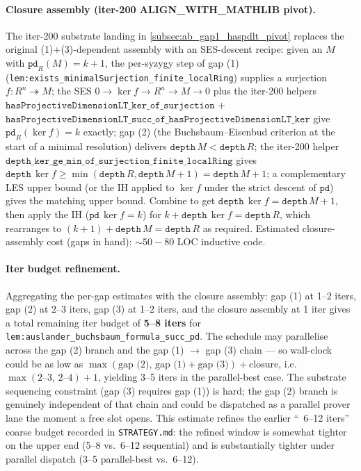 \paragraph{Closure assembly (iter-200 ALIGN\_WITH\_MATHLIB pivot).} The
iter-200 substrate landing in \ref{subsec:ab_gap1_haspdlt_pivot}
replaces the original (1)+(3)-dependent assembly with an SES-descent
recipe: given an \(M\) with \(\texttt{pd}_R(M) = k+1\), the
per-syzygy step of gap (1)
(\texttt{lem:exists_minimalSurjection_finite_localRing}) supplies a
surjection \(f : R^n \twoheadrightarrow M\); the SES
\(0 \to \ker f \to R^n \to M \to 0\) plus the iter-200 helpers
\(\texttt{hasProjectiveDimensionLT\_ker\_of\_surjection}\) +
\(\texttt{hasProjectiveDimensionLT\_succ\_of\_hasProjectiveDimensionLT\_ker}\)
give \(\texttt{pd}_R(\ker f) = k\) exactly; gap (2) (the
Buchsbaum--Eisenbud criterion at the start of a minimal resolution)
delivers \(\texttt{depth}\,M < \texttt{depth}\,R\); the iter-200
helper
\(\texttt{depth\_ker\_ge\_min\_of\_surjection\_finite\_localRing}\)
gives \(\texttt{depth}\,\ker f \geq \min(\texttt{depth}\,R,
\texttt{depth}\,M + 1) = \texttt{depth}\,M + 1\); a complementary LES
upper bound (or the IH applied to \(\ker f\) under the strict
descent of \(\texttt{pd}\)) gives the matching upper bound. Combine
to get \(\texttt{depth}\,\ker f = \texttt{depth}\,M + 1\), then apply
the IH (\(\texttt{pd}\,\ker f = k\)) for
\(k + \texttt{depth}\,\ker f = \texttt{depth}\,R\), which rearranges
to \((k+1) + \texttt{depth}\,M = \texttt{depth}\,R\) as required.
Estimated closure-assembly cost (gaps in hand): \(\sim 50-80\) LOC
inductive code.

\paragraph{Iter budget refinement.} Aggregating the per-gap
estimates with the closure assembly: gap (1) at 1--2 iters, gap (2)
at 2--3 iters, gap (3) at 1--2 iters, and the closure assembly
at 1 iter gives a total remaining iter budget of \textbf{5--8 iters}
for \texttt{lem:auslander_buchsbaum_formula_succ_pd}. The schedule may
parallelise across the gap (2) branch and the gap (1) \(\to\) gap (3)
chain --- so wall-clock could be as low as
\(\max(\text{gap (2)},\, \text{gap (1)} + \text{gap (3)}) +
\text{closure}\), i.e.\ \(\max(2\text{--}3,\, 2\text{--}4) + 1\),
yielding 3--5 iters in the parallel-best case. The substrate
sequencing constraint (gap (3) requires gap (1)) is hard; the gap
(2) branch is genuinely independent of that chain and could be
dispatched as a parallel prover lane the moment a free slot opens.
This estimate refines the earlier ``~6--12 iters'' coarse budget
recorded in \texttt{STRATEGY.md}: the refined window is somewhat
tighter on the upper end (5--8 vs.\ 6--12 sequential) and is
substantially tighter under parallel dispatch (3--5 parallel-best
vs.\ 6--12).

